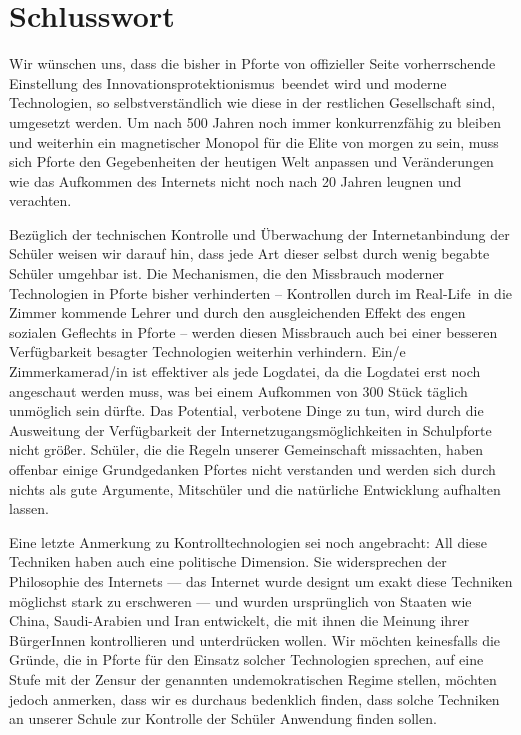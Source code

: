 \documentclass[10pt,a4paper,notitlepage]{scrartcl}
\newcommand{\gfo}{\grqq\ }
\newcommand{\gfu}{\glqq}
\begin{document}
\section{Schlusswort}
\begin{multicols}{2}
Wir wünschen uns, dass die bisher in Pforte von offizieller Seite vorherrschende Einstellung des \gfu Innovationsprotektionismus\gfo beendet wird und moderne Technologien, so selbstverständlich wie diese in der restlichen Gesellschaft sind, umgesetzt werden. Um nach 500 Jahren noch immer konkurrenzfähig zu bleiben und weiterhin ein magnetischer Monopol für die Elite von morgen zu sein, muss sich Pforte den Gegebenheiten der heutigen Welt anpassen und Veränderungen wie das Aufkommen des Internets nicht noch nach 20 Jahren leugnen und verachten.

Bezüglich der technischen Kontrolle und Überwachung der Internetanbindung der Schüler weisen wir darauf hin, dass jede Art dieser selbst durch wenig begabte Schüler umgehbar ist. Die Mechanismen, die den Missbrauch moderner Technologien in Pforte bisher verhinderten -- Kontrollen durch im \gfu Real-Life\gfo in die Zimmer kommende Lehrer und durch den ausgleichenden Effekt des engen sozialen Geflechts in Pforte -- werden diesen Missbrauch auch bei einer besseren Verfügbarkeit besagter Technologien weiterhin verhindern. Ein/e Zimmerkamerad/in ist effektiver als jede Logdatei, da die Logdatei erst noch angeschaut werden muss, was bei einem Aufkommen von 300 Stück täglich unmöglich sein dürfte. Das Potential, verbotene Dinge zu tun, wird durch die Ausweitung der Verfügbarkeit der Internetzugangsmöglichkeiten in Schulpforte nicht größer. Schüler, die die Regeln unserer Gemeinschaft missachten, haben offenbar einige Grundgedanken Pfortes nicht verstanden und werden sich durch nichts als gute Argumente, Mitschüler und die natürliche Entwicklung aufhalten lassen.

Eine letzte Anmerkung zu Kontrolltechnologien sei noch angebracht: All diese Techniken haben auch eine politische Dimension. Sie widersprechen der Philosophie des Internets --- das Internet wurde designt um exakt diese Techniken möglichst stark zu erschweren --- und wurden ursprünglich von Staaten wie China, Saudi-Arabien und Iran entwickelt, die mit ihnen die Meinung ihrer BürgerInnen kontrollieren und unterdrücken wollen. Wir möchten keinesfalls die Gründe, die in Pforte für den Einsatz solcher Technologien sprechen, auf eine Stufe mit der Zensur der genannten undemokratischen Regime stellen, möchten jedoch anmerken, dass wir es durchaus bedenklich finden, dass solche Techniken an unserer Schule zur Kontrolle der Schüler Anwendung finden sollen.
\end{multicols}
%
%
%
\end{document}
